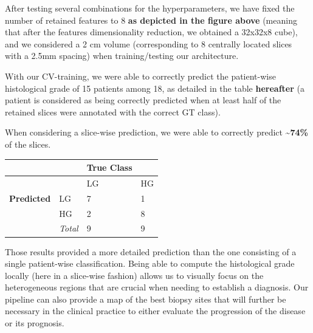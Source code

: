 \documentclass[]{article}
\begin{document}
After testing several combinations for the hyperparameters, we have
fixed the number of retained features to 8 \textbf{as depicted in the
figure above} (meaning that after the features dimensionality reduction,
we obtained a 32x32x8 cube), and we considered a 2 cm volume
(corresponding to 8 centrally located slices with a 2.5mm spacing) when
training/testing our architecture.

With our CV-training, we were able to correctly predict the patient-wise
histological grade of 15 patients among 18, as detailed in the table
\textbf{hereafter} (a patient is considered as being correctly predicted
when at least half of the retained slices were annotated with the
correct GT class).

When considering a slice-wise prediction, we were able to correctly
predict \textbf{\textasciitilde{}74\%} of the slices.

\begin{longtable}[c]{@{}llll@{}}
\toprule
& & \textbf{True Class} &\tabularnewline
\midrule
\endhead
& & LG & HG\tabularnewline
\textbf{Predicted} & LG & 7 & 1\tabularnewline
& HG & 2 & 8\tabularnewline
& \emph{Total} & 9 & 9\tabularnewline
\bottomrule
\end{longtable}

Those results provided a more detailed prediction than the one
consisting of a single patient-wise classification. Being able to
compute the histological grade locally (here in a slice-wise fashion)
allows us to visually focus on the heterogeneous regions that are
crucial when needing to establish a diagnosis. Our pipeline can also
provide a map of the best biopsy sites that will further be necessary in
the clinical practice to either evaluate the progression of the disease
or its prognosis.
\end{document}
